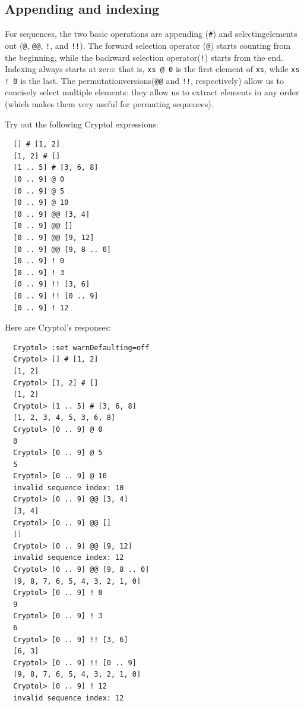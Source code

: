 \subsection{Appending and indexing}
\label{sec:appending-indexing}

For sequences, the two basic operations are appending\indAppend
(\texttt{\#}) and selecting\indIndex elements out (\texttt{@},
\texttt{@@}, \texttt{!}, and \texttt{!!}). The forward selection
operator (\texttt{@}) starts counting from the beginning, while the
backward selection operator\indRIndex (\texttt{!}) starts from the
end. Indexing always starts at zero: that is, \texttt{xs @ 0} is the
first element of \texttt{xs}, while \texttt{xs !\ 0} is the last. The
permutation\indIndexs versions\indRIndexs (\texttt{@@} and
\texttt{!!}, respectively) allow us to concisely select multiple
elements: they allow us to extract elements in any order (which makes
them very useful for permuting sequences).


\begin{Exercise}\label{ex:seq:7}
Try out the following Cryptol expressions:
\begin{Verbatim}
  [] # [1, 2]
  [1, 2] # []
  [1 .. 5] # [3, 6, 8]
  [0 .. 9] @ 0
  [0 .. 9] @ 5
  [0 .. 9] @ 10
  [0 .. 9] @@ [3, 4]
  [0 .. 9] @@ []
  [0 .. 9] @@ [9, 12]
  [0 .. 9] @@ [9, 8 .. 0]
  [0 .. 9] ! 0
  [0 .. 9] ! 3
  [0 .. 9] !! [3, 6]
  [0 .. 9] !! [0 .. 9]
  [0 .. 9] ! 12
\end{Verbatim}
\end{Exercise}
\begin{Answer}
Here are Cryptol's responses:
\begin{Verbatim}
  Cryptol> :set warnDefaulting=off
  Cryptol> [] # [1, 2]
  [1, 2]
  Cryptol> [1, 2] # []
  [1, 2]
  Cryptol> [1 .. 5] # [3, 6, 8]
  [1, 2, 3, 4, 5, 3, 6, 8]
  Cryptol> [0 .. 9] @ 0
  0
  Cryptol> [0 .. 9] @ 5
  5
  Cryptol> [0 .. 9] @ 10
  invalid sequence index: 10
  Cryptol> [0 .. 9] @@ [3, 4]
  [3, 4]
  Cryptol> [0 .. 9] @@ []
  []
  Cryptol> [0 .. 9] @@ [9, 12]
  invalid sequence index: 12
  Cryptol> [0 .. 9] @@ [9, 8 .. 0]
  [9, 8, 7, 6, 5, 4, 3, 2, 1, 0]
  Cryptol> [0 .. 9] ! 0
  9
  Cryptol> [0 .. 9] ! 3
  6
  Cryptol> [0 .. 9] !! [3, 6]
  [6, 3]
  Cryptol> [0 .. 9] !! [0 .. 9]
  [9, 8, 7, 6, 5, 4, 3, 2, 1, 0]
  Cryptol> [0 .. 9] ! 12
  invalid sequence index: 12
\end{Verbatim}
\end{Answer}

